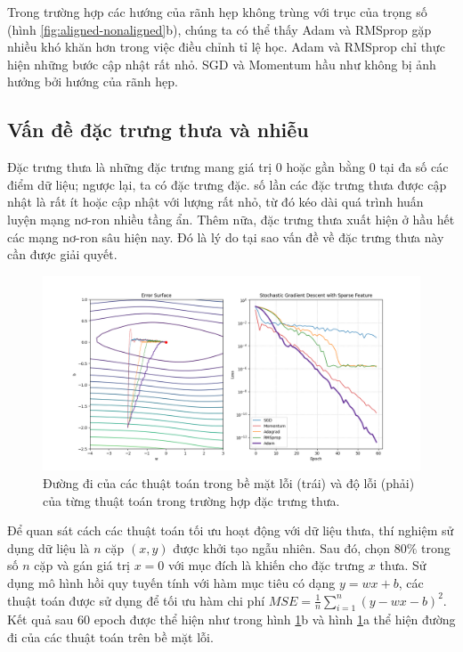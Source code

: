 Trong trường hợp các hướng của rãnh hẹp không trùng với trục của trọng số (hình \ref{fig:aligned-nonaligned}b), chúng ta có thể thấy Adam và RMSprop gặp nhiều khó khăn hơn trong việc điều chỉnh tỉ lệ học. Adam và RMSprop chỉ thực hiện những bước cập nhật rất nhỏ. SGD và Momentum hầu như không bị ảnh hưởng bởi hướng của rãnh hẹp.

\subsection{Vấn đề đặc trưng thưa và nhiễu}

Đặc trưng thưa là những đặc trưng mang giá trị 0 hoặc gần bằng 0 tại đa số các điểm dữ liệu; ngược lại, ta có đặc trưng đặc. số lần các đặc trưng thưa được cập nhật là rất ít hoặc cập nhật với lượng rất nhỏ, từ đó kéo dài quá trình huấn luyện mạng nơ-ron nhiều tầng ẩn. Thêm nữa, đặc trưng thưa xuất hiện ở hầu hết các mạng nơ-ron sâu hiện nay. Đó là lý do tại sao vấn đề về đặc trưng thưa này cần được giải quyết.

\begin{figure}[htp]
	\centering
	\includegraphics[width=140 mm]{images/sparse.png}
	\caption{Đường đi của các thuật toán trong bề mặt lỗi (trái) và độ lỗi (phải) của từng thuật toán trong trường hợp đặc trưng thưa.}
	\label{fig:sparse}
\end{figure}

Để quan sát cách các thuật toán tối ưu hoạt động với dữ liệu thưa, thí nghiệm sử dụng dữ liệu là $n$ cặp $(x,y)$ được khởi tạo ngẫu nhiên. Sau đó, chọn 80$\%$ trong số $n$ cặp và gán giá trị $x = 0$ với mục đích là khiến cho đặc trưng $x$ thưa. Sử dụng mô hình hồi quy tuyến tính với hàm mục tiêu có dạng $y = wx + b$, các thuật toán được sử dụng để tối ưu hàm chi phí $MSE = \frac{1}{n}\sum_{i=1}^n(y - wx - b)^2$. Kết quả sau 60 epoch được thể hiện như trong hình \ref{fig:sparse}b và hình \ref{fig:sparse}a thể hiện đường đi của các thuật toán trên bề mặt lỗi.

